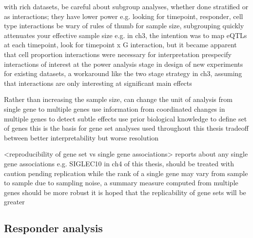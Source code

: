 \begin{outline}
\1 with rich datasets, be careful about subgroup analyses, whether done stratified or as interactions; they have lower power
    \2 e.g. looking for timepoint, responder, cell type interactions
    \2 be wary of rules of thumb for sample size, subgrouping quickly attenuates your effective sample size
        \3 e.g. in ch3, the intention was to map eQTLs at each timepoint, look for timepoint x G interaction, but it became apparent that cell proportion interactions were necessary for interpretation
    \2 prespecify interactions of interest at the power analysis stage in design of new experiments
    \2 for existing datasets, a workaround like the two stage strategy in ch3, assuming that interactions are only interesting at significant main effects

\1 Rather than increasing the sample size, can change the unit of analysis from single gene to multiple genes
    \2 use information from coordinated changes in multiple genes to detect subtle effects
    \2 use prior biological knowledge to define set of genes
    \2 this is the basis for gene set analyses used throughout this thesis
    \2 tradeoff between better interpretability but worse resolution

\1 <reproducibility of gene set vs single gene associations> 
    \2 reports about any single gene associations e.g. SIGLEC10 in ch4 of this thesis, should be treated with caution pending replication
    \2 while the rank of a single gene may vary from sample to sample due to sampling noise, a summary measure computed from multiple genes should be more robust
    \2 it is hoped that the replicability of gene sets will be greater

\subsection{Responder analysis}


\end{outline}
